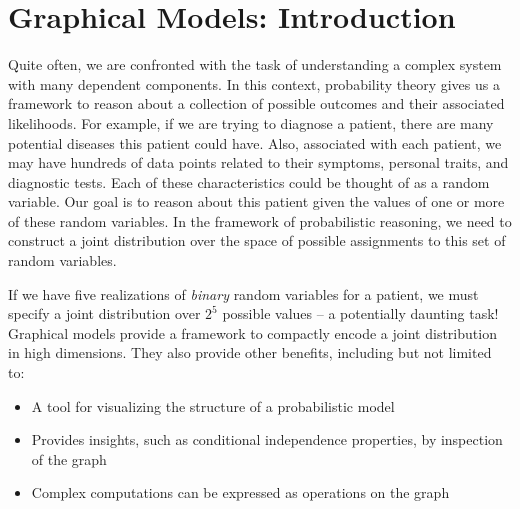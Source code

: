 \documentclass[12pt]{report}
\begin{document}

\maketitle

\vspace*{.1in}
\setlength{\parindent}{0cm}



\section{Graphical Models: Introduction}
Quite often, we are confronted with the task of understanding a complex system
with many dependent components. In this context, probability theory
gives us a framework to reason about a collection of possible outcomes
and their associated likelihoods. For example, if we are trying to
diagnose a patient, there are many potential diseases this patient
could have. Also, associated with each patient, we may have hundreds
of data points related to their symptoms, personal traits, and
diagnostic tests. Each of these characteristics could be thought of as
a random variable. Our goal is to reason about this patient given the
values of one or more of these random variables. In the framework of
probabilistic reasoning, we need to construct a joint distribution
over the space of possible assignments to this set of random
variables. 

If we have five realizations of \emph{binary} random variables for a patient, we must specify a joint
distribution over $2^5$ possible values -- a potentially daunting task! Graphical models provide a
framework to compactly encode a joint distribution in high
dimensions. They also provide other benefits, including but not
limited to:
\begin{itemize}
\item A tool for visualizing the structure of a probabilistic model
\item Provides insights, such as conditional independence properties, by inspection of the graph
\item Complex computations can be expressed as operations on the graph
\end{itemize}
\end{document}
